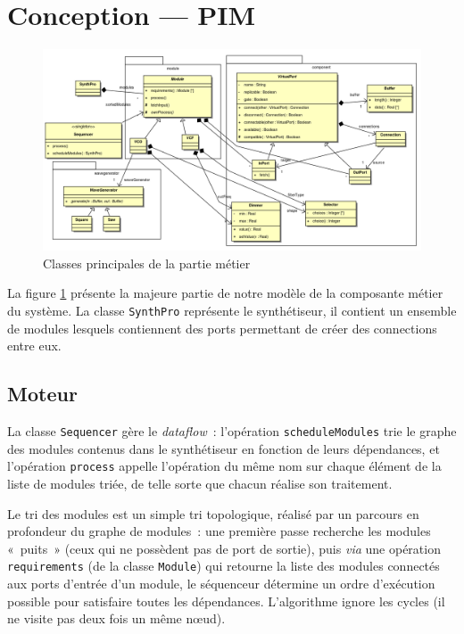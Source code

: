 \section{Conception — PIM}

\begin{figure}[p]
\centering
\includegraphics[width=23cm,angle=90]{../img/ps/business-pim-light.pdf}
\caption{Classes principales de la partie métier}
\label{pim-class}
\end{figure}

La figure \ref{pim-class} présente la majeure partie de notre modèle de la composante
métier du système. La classe \verb!SynthPro! représente le
synthétiseur, il contient un ensemble de modules lesquels
contiennent des ports permettant de créer des connections entre
eux.

\subsection{Moteur}

La classe \verb!Sequencer! gère le \emph{dataflow}~: l'opération
\verb!scheduleModules! trie le graphe des modules contenus dans le
synthétiseur en fonction de leurs dépendances, et l'opération
\verb!process! appelle l'opération du même nom sur chaque élément
de la liste de modules triée, de telle sorte que chacun réalise son
traitement.

Le tri des modules est un simple tri topologique,
réalisé par un parcours en profondeur du graphe de modules~: une
première passe recherche les modules «~puits~» (ceux qui ne
possèdent pas de port de sortie), puis \emph{via} une opération
\verb!requirements! (de la classe \verb!Module!) qui retourne la
liste des modules connectés aux ports d'entrée d'un module, le
séquenceur détermine un ordre d'exécution possible pour satisfaire
toutes les dépendances. L'algorithme ignore les cycles (il ne
visite pas deux fois un même nœud).

